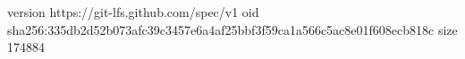 version https://git-lfs.github.com/spec/v1
oid sha256:335db2d52b073afc39c3457e6a4af25bbf3f59ca1a566c5ac8e01f608ecb818c
size 174884

